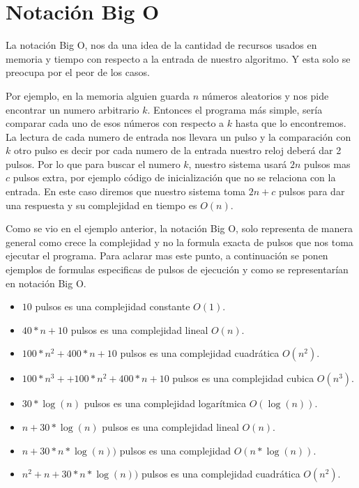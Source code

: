\section{Notación Big O}
 
 La notación Big O, nos da una idea de la cantidad de recursos usados en memoria y tiempo con respecto a la entrada de nuestro algoritmo. Y esta solo se preocupa por el peor de los casos.
 
 
 Por ejemplo, en la memoria alguien guarda $n$ números aleatorios y nos pide encontrar un numero arbitrario $k$. Entonces el programa más simple, sería comparar cada uno de esos números con respecto a $k$ hasta que lo encontremos. La lectura de cada numero de entrada nos llevara un pulso y la comparación con $k$ otro pulso es decir por cada numero de la entrada nuestro reloj deberá dar 2 pulsos. Por lo que para buscar el numero $k$, nuestro sistema usará $2n$ pulsos mas $c$ pulsos extra, por ejemplo código de inicialización que no se relaciona con la entrada. En este caso diremos que nuestro sistema toma $2n+c$ pulsos para dar una respuesta y su complejidad en tiempo es $O(n)$. 
 
Como se vio en el ejemplo anterior, la notación Big O, solo representa de manera general como crece la complejidad y no la formula exacta de pulsos que nos toma ejecutar el programa. Para aclarar mas este punto, a continuación se ponen ejemplos de formulas especificas de pulsos de ejecución y como se representarían en notación Big O.

\begin{itemize}
    \item $10$ pulsos es  una complejidad constante $O(1)$.
    \item $40*n+10$ pulsos es  una complejidad lineal $O(n)$.
    \item $100*n^2 + 400*n+10$ pulsos es  una complejidad cuadrática $O(n^2)$.
    \item $100*n^3 + + 100*n^2 + 400*n+10$ pulsos es  una complejidad cubica $O(n^3)$.
    \item $30*\log(n)$ pulsos es  una complejidad logarítmica $O(\log(n))$. 
    \item $n + 30*\log(n)$ pulsos es  una complejidad lineal $O(n)$.
    \item $n + 30*n*\log(n))$ pulsos es  una complejidad $O(n*\log(n))$.
    \item $n^2 + n + 30*n*\log(n))$ pulsos es  una complejidad cuadrática $O(n^2)$.
\end{itemize}

